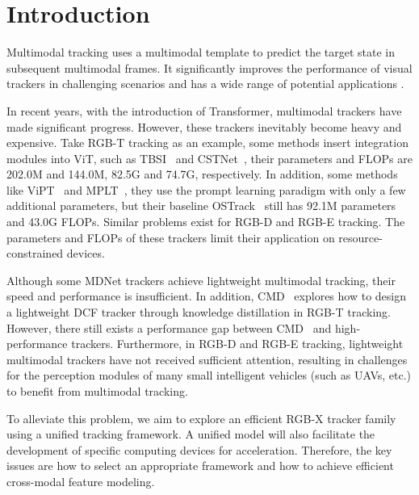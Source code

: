 \section{Introduction}
\label{sec:intro}

Multimodal tracking uses a multimodal template to predict the target state in subsequent multimodal frames. It significantly improves the performance of visual trackers in challenging scenarios and has a wide range of potential applications \cite{rgbt1,rgbd2,rgbe3,rgbs50}.

In recent years, with the introduction of Transformer, multimodal trackers have made significant progress. However, these trackers inevitably become heavy and expensive. Take RGB-T tracking as an example, some methods insert integration modules into ViT, such as TBSI~\cite{tbsi} and CSTNet~\cite{cstnet}, their parameters and FLOPs are 202.0M and 144.0M, 82.5G and 74.7G, respectively. In addition, some methods like ViPT~\cite{vipt} and MPLT~\cite{mplt}, they use the prompt learning paradigm with only a few additional parameters, but their baseline OSTrack~\cite{ostrack} still has 92.1M parameters and 43.0G FLOPs. Similar problems exist for RGB-D and RGB-E tracking. The parameters and FLOPs of these trackers limit their application on resource-constrained devices. 

Although some MDNet trackers \cite{manet,dafnet,macnet} achieve lightweight multimodal tracking, their speed and performance is insufficient. In addition, CMD~\cite{cmd} explores how to design a lightweight DCF tracker through knowledge distillation in RGB-T tracking. However, there still exists a performance gap between CMD~\cite{cmd} and high-performance trackers. Furthermore, in RGB-D and RGB-E tracking, lightweight multimodal trackers have not received sufficient attention, resulting in challenges for the perception modules of many small intelligent vehicles (such as UAVs, etc.) to benefit from multimodal tracking.



To alleviate this problem, we aim to explore an efficient RGB-X tracker family using a unified tracking framework. A unified model will also facilitate the development of specific computing devices for acceleration. Therefore, the key issues are how to select an appropriate framework and how to achieve efficient cross-modal feature modeling.


